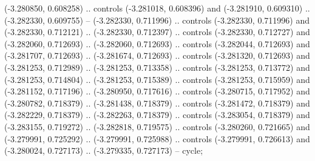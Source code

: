     (-3.280850, 0.608258) .. controls (-3.281018, 0.608396) and (-3.281910, 0.609310) ..
    (-3.282330, 0.609755) --
    (-3.282330, 0.711996) .. controls (-3.282330, 0.711996) and (-3.282330, 0.712121) ..
    (-3.282330, 0.712397) .. controls (-3.282330, 0.712727) and (-3.282060, 0.712693) ..
    (-3.282060, 0.712693) .. controls (-3.282044, 0.712693) and (-3.281707, 0.712693) ..
    (-3.281674, 0.712693) .. controls (-3.281320, 0.712693) and (-3.281253, 0.712989) ..
    (-3.281253, 0.713358) .. controls (-3.281253, 0.713772) and (-3.281253, 0.714804) ..
    (-3.281253, 0.715389) .. controls (-3.281253, 0.715959) and (-3.281152, 0.717196) ..
    (-3.280950, 0.717616) .. controls (-3.280715, 0.717952) and (-3.280782, 0.718379) ..
    (-3.281438, 0.718379) .. controls (-3.281472, 0.718379) and (-3.282229, 0.718379) ..
    (-3.282263, 0.718379) .. controls (-3.283054, 0.718379) and (-3.283155, 0.719272) ..
    (-3.282818, 0.719575) .. controls (-3.280260, 0.721665) and (-3.279991, 0.725292) ..
    (-3.279991, 0.725988) .. controls (-3.279991, 0.726613) and (-3.280024, 0.727173) ..
    (-3.279335, 0.727173) --
    cycle;

